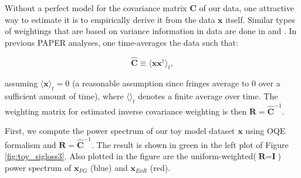 \documentclass[preprint2,numberedappendix,tighten]{aastex6}  %
\begin{document}
Without a perfect model for the covariance matrix $\textbf{C}$ of our data, one attractive way to estimate it is to empirically derive it from the data $\textbf{x}$ itself. Similar types of weightings that are based on variance information in data are done in \citet{chang_et_al2010} and \citet{switzer_et_al2015}. In previous PAPER analyses, one time-averages the data such that:

\begin{equation}
\widehat{\textbf{C}} \equiv \langle\textbf{xx}^{\dagger}\rangle_{t},
\end{equation}

\noindent assuming $\langle\textbf{x}\rangle_{t} = 0$ (a reasonable assumption since fringes average to $0$ over a sufficient 
amount of time), where $\langle \rangle_{t}$ denotes a finite average over time. The weighting matrix for estimated inverse covariance weighting is then $
\textbf{R} = \widehat{\textbf{C}}^{-1}$.

First, we compute the power spectrum of our toy model dataset $\textbf{x}$ using OQE formalism and $\textbf{R} = \widehat{\textbf{C}}^{-1}$. 
The result is shown in green in the left plot of Figure \ref{fig:toy_sigloss3}. Also plotted in the figure are the uniform-weighted($\textbf{R} = \textbf{I}$) power spectrum of $
\textbf{x}_{FG}$ (blue) and $\textbf{x}_{EoR}$ (red). 
\end{document}

